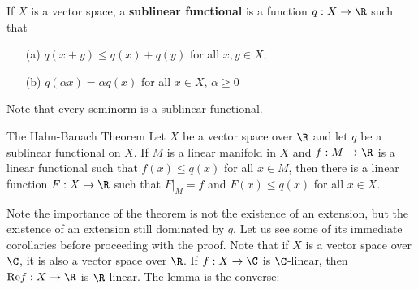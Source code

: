 \begin{defn}
    If $X$ is a vector space, a \textbf{sublinear functional} is a function $q:X\rightarrow \R$ such that \begin{enumerate}
        \item[(a)] $q(x+y) \leq q(x)+q(y)$ for all $x,y \in X$;
        \item[(b)] $q(\alpha x)=\alpha q(x)$ for all $x \in X$, $\alpha \geq 0$
    \end{enumerate}
\end{defn}

Note that every seminorm is a sublinear functional. 

\begin{nthm}{The Hahn-Banach Theorem}
    Let $X$ be a vector space over $\R$ and let $q$ be a sublinear functional on $X$. If $M$ is a linear manifold in $X$ and $f:M\rightarrow \R$ is a linear functional such that $f(x) \leq q(x)$ for all $x \in M$, then there is a linear function $F:X\rightarrow \R$ such that $F\vert_M = f$ and $F(x) \leq q(x)$ for all $x \in X$.
\end{nthm}

Note the importance of the theorem is not the existence of an extension, but the existence of an extension still dominated by $q$. Let us see some of its immediate corollaries before proceeding with the proof. Note that if $X$ is a vector space over $\C$, it is also a vector space over $\R$. If $f:X\rightarrow \C$ is $\C$-linear, then $\text{Re}f:X\rightarrow \R$ is $\R$-linear. The lemma is the converse:


